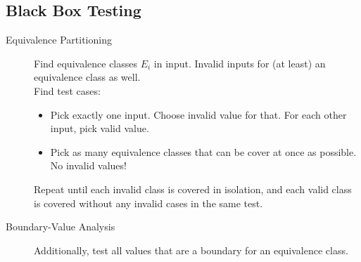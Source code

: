 \subsection*{Black Box Testing}

\begin{description}
	\item[Equivalence Partitioning] Find equivalence classes $E_i$ in input.
	Invalid inputs for (at least) an equivalence class as well. \\ Find test
	cases:
	\begin{itemize}
		\item Pick exactly one input. Choose invalid value for that. For each
		other input, pick valid value.
		\item Pick as many equivalence classes that can be cover at once as
		possible. No invalid values!
	\end{itemize}
	Repeat until each invalid class is covered in isolation, and each valid
	class is covered without any invalid cases in the same test.

	\item[Boundary-Value Analysis] Additionally, test all values that are a
	boundary for an equivalence class.


\end{description}
